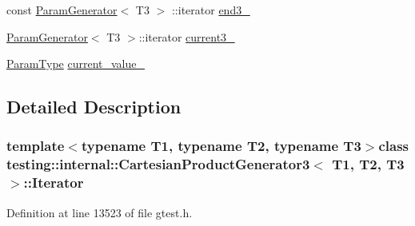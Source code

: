 \begin{DoxyCompactItemize}
\item 
const \hyperlink{classtesting_1_1internal_1_1ParamGenerator}{\-Param\-Generator}$<$ \-T3 $>$\*
\-::iterator \hyperlink{classtesting_1_1internal_1_1CartesianProductGenerator3_1_1Iterator_a41f5fcf2148ca9237a3157b3cb8599b4}{end3\-\_\-}
\item 
\hyperlink{classtesting_1_1internal_1_1ParamGenerator}{\-Param\-Generator}$<$ \-T3 $>$\-::iterator \hyperlink{classtesting_1_1internal_1_1CartesianProductGenerator3_1_1Iterator_aebedcdf0a5114a1e4e9fc9bdc6ae4ff1}{current3\-\_\-}
\item 
\hyperlink{classtesting_1_1internal_1_1CartesianProductGenerator3_a61f35be35e7acfed27d8b46ee9713bb3}{\-Param\-Type} \hyperlink{classtesting_1_1internal_1_1CartesianProductGenerator3_1_1Iterator_a1b76a85d1482a16a96efc293e8384512}{current\-\_\-value\-\_\-}
\end{DoxyCompactItemize}


\subsection{\-Detailed \-Description}
\subsubsection*{template$<$typename T1, typename T2, typename T3$>$class testing\-::internal\-::\-Cartesian\-Product\-Generator3$<$ T1, T2, T3 $>$\-::\-Iterator}



\-Definition at line 13523 of file gtest.\-h.




